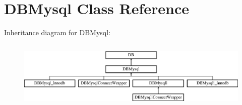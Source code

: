 \hypertarget{classDBMysql}{\section{D\+B\+Mysql Class Reference}
\label{classDBMysql}
}
Inheritance diagram for D\+B\+Mysql\+:\begin{figure}[H]
\begin{center}
\leavevmode
\includegraphics[height=3.313610cm]{classDBMysql}
\end{center}
\end{figure}
